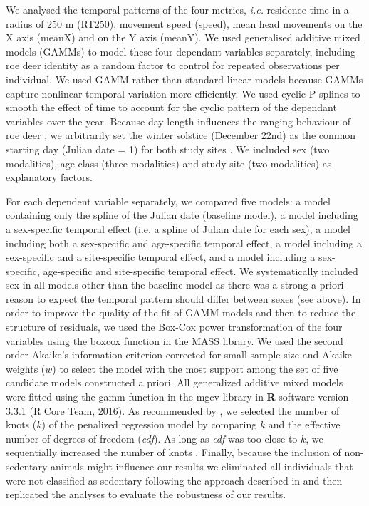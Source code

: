 \documentclass[a4paper,11pt]{article}
\begin{document}
We analysed the temporal patterns of the four metrics, \textit{i.e.}
residence time in a radius of 250 m (RT250), movement speed (speed),
mean head movements on the X axis (meanX) and on the Y axis
(meanY). We used generalised additive mixed models (GAMMs) to model
these four dependant variables separately, including roe deer identity
as a random factor to control for repeated observations per
individual. We used GAMM rather than standard linear models because
GAMMs capture nonlinear temporal variation more efficiently. We used
cyclic P-splines to smooth the effect of time to account for the
cyclic pattern of the dependant variables over the year. Because day
length influences the ranging behaviour of roe deer
\citep{borger_integrated_2006}, we arbitrarily set the winter solstice
(December 22nd) as the common starting day (Julian date = 1) for both
study sites \cite[see also][]{morellet_seasonality_2013}. We included
sex (two modalities), age class (three modalities) and study site (two
modalities) as explanatory factors.

For each dependent variable separately, we compared five models: a
model containing only the spline of the Julian date (baseline model),
a model including a sex-specific temporal effect (i.e. a spline of
Julian date for each sex), a model including both a sex-specific and
age-specific temporal effect, a model including a sex-specific and a
site-specific temporal effect, and a model including a sex-specific,
age-specific and site-specific temporal effect. We systematically
included sex in all models other than the baseline model as there was
a strong a priori reason to expect the temporal pattern should differ
between sexes (see above). In order to improve the quality of the fit
of GAMM models and then to reduce the structure of residuals, we used
the Box-Cox power transformation of the four variables using the
boxcox function in the \textsf{MASS} library. We used the second order
Akaike’s information criterion corrected for small sample size
\citep[AICc,][]{burnham_model_1998} and Akaike weights ($w$) to select
the model with the most support among the set of five candidate models
constructed a priori. All generalized additive mixed models were
fitted using the \textsf{gamm} function in the \textsf{mgcv} library
\cite{wood_generalized_2006} in \textbf{\textsf{R}} software version
3.3.1 (R Core Team, 2016). As recommended by \cite{Wood2017}, we
selected the number of knots ($k$) of the penalized regression model
by comparing $k$ and the effective number of degrees of freedom
(\textit{edf}). As long as \textit{edf} was too close to $k$, we
sequentially increased the number of knots \citep{Wood2017}. Finally,
because the inclusion of non-sedentary animals might influence our
results we eliminated all individuals that were not classified as
sedentary following the approach described in
\cite{cagnacci_partial_2011} and then replicated the analyses to
evaluate the robustness of our results.
\end{document}
